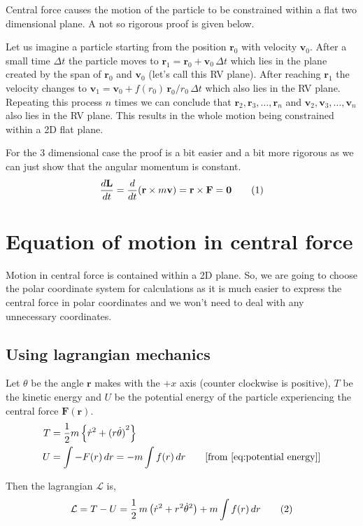 \documentclass[a4paper, 12pt]{article}
\renewcommand{\indent}{\hspace{3ex}}
\newcommand\labelthis[1]{\addtocounter{equation}{1}\tag{\theequation}\label{#1}}
\renewcommand{\r}{\mathbf{r}}
\renewcommand{\v}{\mathbf{v}}
\renewcommand{\vec}[1]{\mathbf{#1}}
\newcommand{\ddt}[1]{\frac{d#1}{dt}}
\newcommand{\Lagr}{\mathcal{L}}
\begin{document}
\indent Central force causes the motion of the particle to be constrained within a flat two dimensional plane. A not so rigorous proof is given below.

\indent Let us imagine a particle starting from the position $\r_0$ with velocity $\v_0$. After a small time $\Delta t$ the particle moves to $\r_1 = \r_0 + \v_0 \, \Delta t$ which lies in the plane created by the span of $\r_0$ and $\v_0$ (let's call this RV plane). After reaching $\r_1$ the velocity changes to $\v_1 = \v_0 + f(r_0) \, {\r_0}/{r_0} \, \Delta t$ which also lies in the RV plane. Repeating this process $n$ times we can conclude that $ \r_2, \r_3, \dots, \r_n$ and $ \v_2, \v_3, \dots, \v_n$ also lies in the RV plane. This results in the whole motion being constrained within a 2D flat plane.

\indent For the 3 dimensional case the proof is a bit easier and a bit more rigorous as we can just show that the angular momentum is constant.
\[ \ddt{\vec{L}} = \ddt{} (\r \times m \v) = \r \times \vec{F} = \mathbf{0} \labelthis{eq:conserv L vec analysis} \]

\section{Equation of motion in central force}\label{equation of motion}

\indent Motion in central force is contained within a 2D plane. So, we are going to choose the polar coordinate system for calculations as it is much easier to express the central force in polar coordinates and we won't need to deal with any unnecessary coordinates.

\subsection{Using lagrangian mechanics}\label{eom lagrangian}

\indent Let $\theta$ be the angle $\r$ makes with the $+x$ axis (counter clockwise is positive), $T$ be the kinetic energy and $U$ be the potential energy of the particle experiencing the central force $\vec{F}(\r)$.
\begin{align}
	T &= \frac{1}{2} m \left\{ \dot{r}^2 + {(r \dot{\theta})}^2 \right\} \label{kinetic energy} \\
	U &= \int -F(r) \, dr = - m \int f(r) \, dr \nonumber \tag*{[from~\eqref{eq:potential energy}]}
\end{align}

Then the lagrangian $\Lagr$ is,
\[ \Lagr = T - U = \frac{1}{2} \, m \left( \dot{r}^2 + r^2 \dot{\theta}^2 \right) + m \int f(r) \, dr 
																					\labelthis{eq:lagrangian} \]
\end{document}
